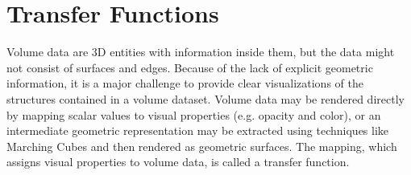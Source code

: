 %

\section{Transfer Functions \label{literature_of_transfer_function}}
Volume data are 3D entities with information inside them, but the data might not consist of surfaces and edges.
Because of the lack of explicit geometric information, %
it is a major challenge to provide clear visualizations of the structures contained in a volume dataset.
Volume data may be rendered directly by mapping scalar values to visual properties (e.g. opacity and color), or an intermediate geometric representation may be extracted using techniques like Marching Cubes \cite{lorensen_marching_1987} and then rendered as geometric surfaces. The mapping, which assigns visual properties to volume data, is called a transfer function.

